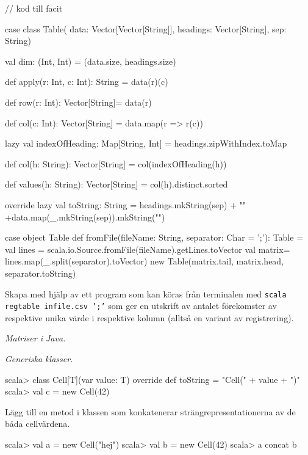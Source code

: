\begin{CodeSmall}
// kod till facit

case class Table(
  data: Vector[Vector[String]], 
  headings: Vector[String], 
  sep: String){

  val dim: (Int, Int) = (data.size, headings.size)

  def apply(r: Int, c: Int): String = data(r)(c)

  def row(r: Int): Vector[String]= data(r)

  def col(c: Int): Vector[String] = data.map(r => r(c))

  lazy val indexOfHeading: Map[String, Int] = headings.zipWithIndex.toMap

  def col(h: String): Vector[String] = col(indexOfHeading(h)) 

  def values(h: String): Vector[String] = col(h).distinct.sorted

  override lazy val toString: String = 
    headings.mkString(sep) + "\n" +data.map(_.mkString(sep)).mkString("\n")
}
case object Table {
  def fromFile(fileName: String, separator: Char = ';'): Table = {
    val lines = scala.io.Source.fromFile(fileName).getLines.toVector
    val matrix= lines.map(_.split(separator).toVector) 
    new Table(matrix.tail, matrix.head, separator.toString)
  }
}
\end{CodeSmall}

\Subtask Skapa med hjälp av  ett program som kan köras från terminalen med \texttt{scala regtable infile.csv ';'} som ger en utskrift av antalet förekomster av respektive unika värde i respektive kolumn (alltså en variant av registrering).



\Task \emph{Matriser i Java.}





\Task \emph{Generiska klasser.} 

\begin{REPL}
scala> class Cell[T](var value: T){
         override def toString = "Cell(" + value + ")"
       }
scala> val c = new Cell(42)
\end{REPL}

\Subtask Lägg till en metod  i klassen  som konkatenerar strängrepresentationerna av de båda cellvärdena.

\begin{REPL}
scala> val a = new Cell("hej")
scala> val b = new Cell(42)
scala> a concat b
\end{REPL}

